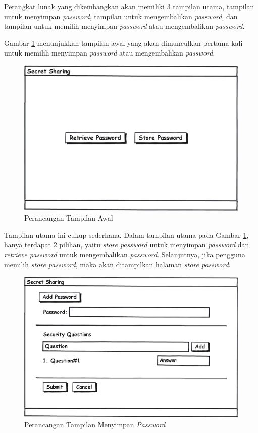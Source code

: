Perangkat lunak yang dikembangkan akan memiliki 3 tampilan utama, tampilan untuk menyimpan \textit{password}, tampilan untuk mengembalikan \textit{password}, dan tampilan untuk memilih menyimpan \textit{password} atau mengembalikan \textit{password}.

Gambar \ref{fig:tampilan-awal} menunjukkan tampilan awal yang akan dimunculkan pertama kali untuk memilih menyimpan \textit{password} atau mengembalikan \textit{password}.

\begin{figure}[H]
	\centerline{\includegraphics[scale=0.5]{Gambar/tampilan-utama}}
	\caption{Perancangan Tampilan Awal}\label{fig:tampilan-awal}
\end{figure}

Tampilan utama ini cukup sederhana. Dalam tampilan utama pada Gambar \ref{fig:tampilan-awal}, hanya terdapat 2 pilihan, yaitu \textit{store password} untuk menyimpan \textit{password} dan \textit{retrieve password} untuk mengembalikan \textit{password}. Selanjutnya, jika pengguna memilih \textit{store password}, maka akan ditampilkan halaman \textit{store password}.

\begin{figure}[H]
	\centerline{\includegraphics[scale=0.5]{Gambar/store_password}}
	\caption{Perancangan Tampilan Menyimpan \textit{Password}}\label{fig:store_password}
\end{figure}

